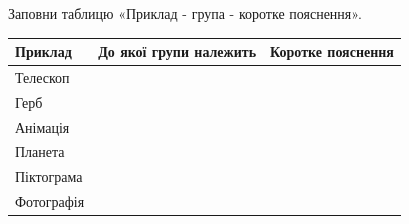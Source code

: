\documentclass[11pt,a4paper]{article}
\begin{document}
Заповни таблицю «Приклад - група - коротке пояснення».\par

\begin{tabularx}{\linewidth}{|>{\raggedright\arraybackslash}X|>{\raggedright\arraybackslash}X|>{\raggedright\arraybackslash}X|}\hline

\textbf{Приклад} & \textbf{До якої групи належить} & \textbf{Коротке пояснення} \\ \hline

Телескоп &  &  \\ \hline

Герб &  &  \\ \hline

Анімація &  &  \\ \hline

Планета &  &  \\ \hline

Піктограма &  &  \\ \hline

Фотографія &  &  \\ \hline

\end{tabularx}\par
\end{document}
